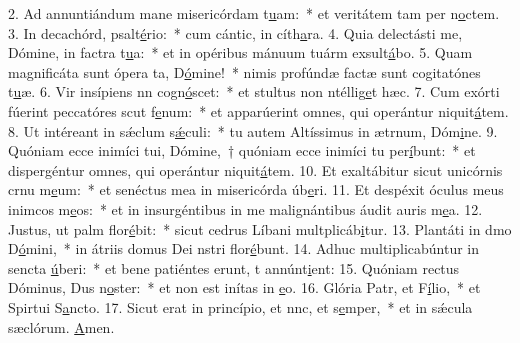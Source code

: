 2. Ad annuntiándum mane misericórdam t\uline{u}am:~* et veritátem tam per n\uline{o}ctem.
3. In decachórd, psalt\uline{é}rio:~* cum cántic, in cíth\uline{a}ra.
4. Quia delectásti me, Dómine, in factra t\uline{u}a:~* et in opéribus mánuum tuárm exsult\uline{á}bo.
5. Quam magnificáta sunt ópera ta, D\uline{ó}mine!~* nimis profúndæ factæ sunt cogitatónes t\uline{u}æ.
6. Vir insípiens nn cogn\uline{ó}scet:~* et stultus non ntéllig\uline{e}t hæc.
7. Cum exórti fúerint peccatóres scut f\uline{e}num:~* et apparúerint omnes, qui operántur niquit\uline{á}tem.
8. Ut intéreant in sǽclum s\uline{ǽ}culi:~* tu autem Altíssimus in ætrnum, Dóm\uline{i}ne.
9. Quóniam ecce inimíci tui, Dómine,~† quóniam ecce inimíci tu per\uline{í}bunt:~* et dispergéntur omnes, qui operántur niquit\uline{á}tem.
10. Et exaltábitur sicut unicórnis crnu m\uline{e}um:~* et senéctus mea in misericórda úb\uline{e}ri.
11. Et despéxit óculus meus inimcos m\uline{e}os:~* et in insurgéntibus in me malignántibus áudit auris m\uline{e}a.
12. Justus, ut palm flor\uline{é}bit:~* sicut cedrus Líbani multplicáb\uline{i}tur.
13. Plantáti in dmo D\uline{ó}mini,~* in átriis domus Dei nstri flor\uline{é}bunt.
14. Adhuc multiplicabúntur in sencta \uline{ú}beri:~* et bene patiéntes erunt, t annúnt\uline{i}ent:
15. Quóniam rectus Dóminus, Dus n\uline{o}ster:~* et non est inítas in \uline{e}o.
16. Glória Patr, et F\uline{í}lio,~* et Spirtui S\uline{a}ncto.
17. Sicut erat in princípio, et nnc, et s\uline{e}mper,~* et in sǽcula sæclórum. \uline{A}men.
